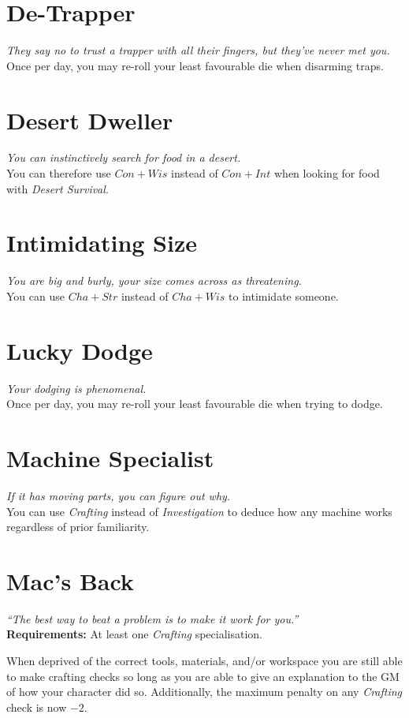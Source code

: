 \section{De-Trapper}
\textit{They say no to trust a trapper with all their fingers, but they've never met you.}\\
Once per day, you may re-roll your least favourable die when disarming traps.

\section{Desert Dweller}
\textit{You can instinctively search for food in a desert.}\\
You can therefore use $Con + Wis$ instead of $Con + Int$ when looking for food with \textit{Desert Survival}.

\section{Intimidating Size}
\textit{You are big and burly, your size comes across as threatening.}\\
You can use $Cha + Str$ instead of $Cha + Wis$ to intimidate someone.

\section{Lucky Dodge}
\textit{Your dodging is phenomenal.}\\
Once per day, you may re-roll your least favourable die when trying to dodge.

\section{Machine Specialist}
\textit{If it has moving parts, you can figure out why.}\\
You can use \textit{Crafting} instead of \textit{Investigation} to deduce how any machine works regardless of prior familiarity.

\section{Mac's Back}
\textit{``The best way to beat a problem is to make it work for you.''}\\
\textbf{Requirements:} At least one \textit{Crafting} specialisation.

When deprived of the correct tools, materials, and/or workspace you are still able to make crafting checks so long as you are able to give an explanation to the GM of how your character did so.
Additionally, the maximum penalty on any \textit{Crafting} check is now $-2$.

